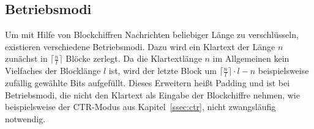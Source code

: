 \subsection{Betriebsmodi}
Um mit Hilfe von Blockchiffren Nachrichten beliebiger Länge zu verschlüsseln, existieren verschiedene Betriebsmodi. Dazu wird ein Klartext der Länge $n$ zunächst in $\lceil \frac{n}{l} \rceil$ Blöcke zerlegt. Da die Klartextlänge $n$ im Allgemeinen kein Vielfaches der Blocklänge $l$ ist, wird der letzte Block um $\lceil \frac{n}{l} \rceil  \cdot l - n$ beispielsweise zufällig gewählte Bits aufgefüllt. Dieses Erweitern heißt Padding und ist bei Betriebsmodi, die nicht den Klartext als Eingabe der Blockchiffre nehmen, wie beispielsweise der CTR-Modus aus Kapitel~\ref{ssec:ctr}, nicht zwangsläufig notwendig.


